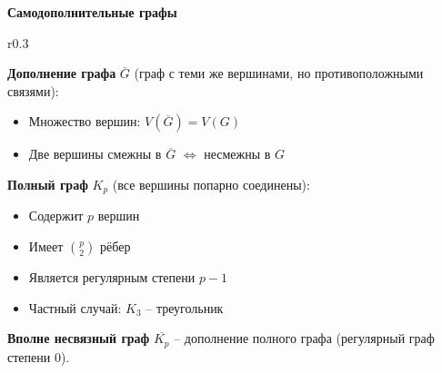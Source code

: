 \textbf{Самодополнительные графы}

\begin{wrapfigure}{r}{0.3\textwidth}
\end{wrapfigure}

\noindent\textbf{Дополнение графа} $\overline{G}$ (граф с теми же вершинами, но противоположными связями):
\begin{itemize}
\item Множество вершин: $V(\overline{G}) = V(G)$
\item Две вершины смежны в $\overline{G}$ $\Leftrightarrow$ несмежны в $G$
\end{itemize}

\noindent\textbf{Полный граф} $K_p$ (все вершины попарно соединены):
\begin{itemize}
\item Содержит $p$ вершин
\item Имеет $\binom{p}{2}$ рёбер
\item Является регулярным степени $p-1$
\item Частный случай: $K_3$ -- треугольник
\end{itemize}

\noindent\textbf{Вполне несвязный граф} $\overline{K_p}$ -- дополнение полного графа (регулярный граф степени 0).

